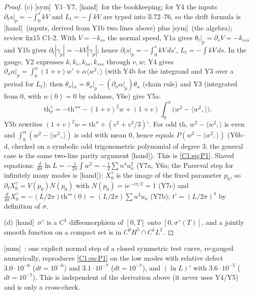 \documentclass[11pt]{article}
\newcommand{\fn}[1]{\texttt{\detokenize{#1}}}
\newcommand{\tH}{\textup{[hand]}}\newcommand{\tS}{\textup{[sym]}}\newcommand{\tC}{\textup{[cert]}}\newcommand{\tI}{\textup{[cited]}}\newcommand{\tN}{\textup{[num]}}\newcommand{\tL}{\textup{[Lean]}}
\newcommand{\ip}[2]{\langle#1,#2\rangle}
\begin{document}
\begin{proof}
(c) \tS\ Y1--Y7, \tH\ for the bookkeeping; for Y4 the inputs $\partial_ts|_p=-\int_0^skV$ and $L_t=-\int kV$ are typed into \fn{C1_sym.py} ll.72--76, so the drift formula is \tH\ (inputs, derived from Y1b two lines above) plus \tS\ (the algebra); review fix15 C1-2. With $V=-k_{ss}$ the normal speed, Y1a gives $\theta_t|_p=\partial_sV=-k_{sss}$ and Y1b gives $\partial_t|\gamma_p|=-kV|\gamma_p|$; hence $\partial_ts|_p=-\int_0^skV\,ds'$, $L_t=-\int kV\,ds$. In the gauge, Y2 expresses $k,k_s,k_{ss},k_{sss}$ through $v,w$; Y4 gives $\partial_\sigma\alpha|_p=\int_0^\alpha(1+v)w'+\alpha\ip{w^2}{}$ (with Y4b for the integrand and Y3 over a period for $L_t$); then $\theta_\sigma|_\alpha=\theta_\sigma|_p-(\partial_\sigma\alpha|_p)\theta_\alpha$ (chain rule) and Y3 (integrated from $0$, with $w(0)=0$ by oddness, Y6e) give Y5a:
\[\mathrm{th}^\gamma_\sigma=-\mathrm{th}''''-(1+v)^2w+(1+v)\int_0^\alpha\bigl(w^2-\ip{w^2}{}\bigr).\]
Y5b rewrites $(1+v)^2w=\mathrm{th}''+(v^2+v^3/3)'$. For odd $\mathrm{th}$, $w^2-\ip{w^2}{}$ is even and $\int_0^\alpha(w^2-\ip{w^2}{})$ is odd with mean $0$, hence equals $P(w^2-\ip{w^2}{})$ (Y6b--d, checked on a symbolic odd trigonometric polynomial of degree 3; the general case is the same two-line parity argument \tH). This is \eqref{C1:eq:P1}. Slaved equations: $\frac{d}{d\sigma}\ln L=-\frac1{2\pi}\int w^2=-\frac12\sum n^4u_n^2$ (Y7a, Y6a; the Parseval step for infinitely many modes is \tH); $X_0^\gamma$ is the image of the fixed parameter $p_0$, so $\partial_tX^\gamma_0=V(p_0)N(p_0)$ with $N(p_0)=ie^{-i\pi/2}=1$ (Y7c) and $\frac{d}{d\sigma}X^\gamma_0=-(L/2\pi)\mathrm{th}'''(0)=(L/2\pi)\sum n^3u_n$ (Y7b); $t'=(L/2\pi)^4$ by definition of $\sigma$.

(d) \tH\ $\sigma^\gamma$ is a $C^1$ diffeomorphism of $[0,T]$ onto $[0,\sigma^\gamma(T)]$, and a jointly smooth function on a compact set is in $C^0H^5\cap C^1L^2$.
\end{proof}
\noindent\tN\ \fn{C1_num.py}: one explicit normal step of a closed symmetric test curve, re-gauged numerically, reproduces \eqref{C1:eq:P1} on the low modes with relative defect $3.0\cdot10^{-6}$ ($dt=10^{-6}$) and $3.1\cdot10^{-7}$ ($dt=10^{-7}$), and $(\ln L)'$ with $3.6\cdot10^{-5}$ ($dt=10^{-7}$). This is independent of the derivation above (it never uses Y4/Y5) and is only a cross-check.
\end{document}
